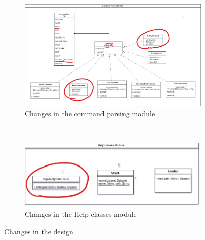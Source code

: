 \documentclass[parskip=full]{scrartcl}
\begin{document}
\begin{figure}[!hbt]
    \centering
    \begin{subfigure}[b]{0.9\linewidth} 
        \centering
        \includegraphics[width=\textwidth]{../Big_classdiagram/Command_Changes.jpg}
        \caption{Changes in the command parsing module}
        \label{Changes in the command parsing module}
    \end{subfigure}
    \\
    \begin{subfigure}[b]{0.9\linewidth}
        \centering
        \includegraphics[width=\textwidth]{../Big_classdiagram/HelpClass_Changes.jpg}
        \caption{Changes in the Help classes module}
        \label{Changes in the Help classes module}
    \end{subfigure}
    \caption{Changes in the design}

\end{figure}
\end{document}
